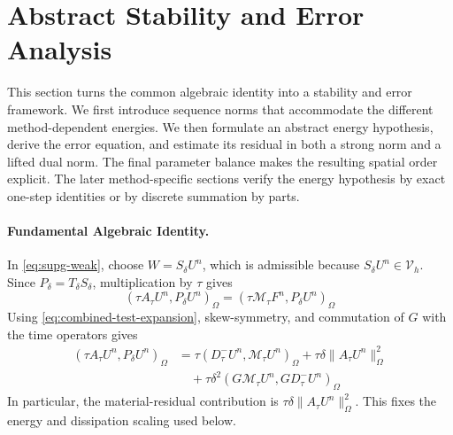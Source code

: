 \documentclass[11pt]{article}
\begin{document}

\section{Abstract Stability and Error Analysis}
\label{sec:meta}
This section turns the common algebraic identity into a stability and error
framework. We first introduce sequence norms that accommodate the different
method-dependent energies. We then formulate an abstract energy hypothesis,
derive the error equation, and estimate its residual in both a strong norm and
a lifted dual norm. The final parameter balance makes the resulting spatial
order explicit. The later method-specific sections verify the energy
hypothesis by exact one-step identities or by discrete summation by parts.

\paragraph{Fundamental Algebraic Identity.}
In \eqref{eq:supg-weak}, choose \(W=S_{\delta}U^n\), which is admissible because
\(S_{\delta}U^n\in\mathcal V_h\). Since
\(P_{\delta}=T_{\delta}S_{\delta}\), multiplication by \(\tau\) gives
\begin{equation}
(\tau A_{\tau}U^n,P_{\delta}U^n)_{\Omega}
=(\tau\mathcal M_{\tau}F^n,P_{\delta}U^n)_{\Omega} \label{eq:abstract-tested-method}
\end{equation}
Using \eqref{eq:combined-test-expansion}, skew-symmetry, and commutation of
\(G\) with the time operators gives
\begin{align}
(\tau A_{\tau}U^n,P_{\delta}U^n)_{\Omega}
&=\tau(D_{\tau}^{-}U^n,\mathcal M_{\tau}U^n)_{\Omega}
+\tau\delta\|A_{\tau}U^n\|_{\Omega}^2 \label{eq:stability_meta}\\
&\quad+\tau\delta^2(G\mathcal M_{\tau}U^n,
GD_{\tau}^{-}U^n)_{\Omega} \label{eq:abstract-tested-expansion-graph}
\end{align}
In particular, the material-residual contribution is
\(\tau\delta\|A_{\tau}U^n\|_{\Omega}^2\). This fixes the energy and
dissipation scaling used below.

\end{document}
